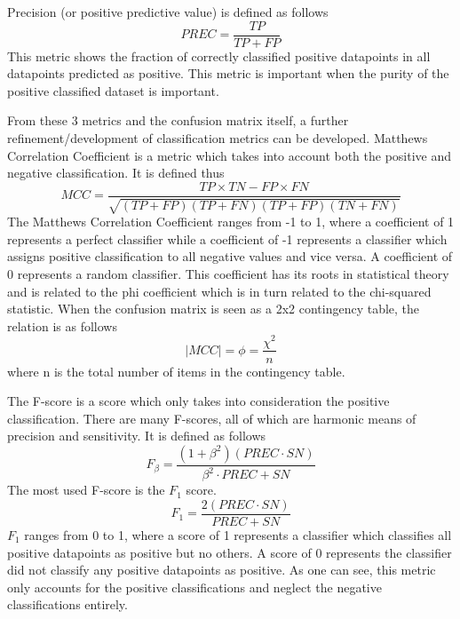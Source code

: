 \documentclass[a4paper,fleqn,usenatbib]{mnras}
\begin{document}
  Precision (or positive predictive value) is defined as follows
  \begin{equation}
  PREC=\frac{TP}{TP+FP}	
  \end{equation}
This metric shows the fraction of correctly classified positive datapoints in all datapoints predicted as positive. This metric is important when the purity of the positive classified dataset is important.

From these 3 metrics and the confusion matrix itself, a further refinement/development of classification metrics can be developed. Matthews Correlation Coefficient is a metric which takes into account both the positive and negative classification. \cite{MCC} It is defined thus
\begin{equation}
MCC = \frac{TP\times TN - FP\times FN}{\sqrt{(TP+FP)(TP+FN)(TP+FP)(TN+FN)}}	
\end{equation}
The Matthews Correlation Coefficient ranges from -1 to 1, where a coefficient of 1 represents a perfect classifier while a coefficient of -1 represents a classifier which assigns positive classification to all negative values and vice versa. A coefficient of 0 represents a random classifier. This coefficient has its roots in statistical theory and is related to the phi coefficient which is in turn related to the chi-squared statistic. When the confusion matrix is seen as a 2x2 contingency table, the relation is as follows
\begin{equation}
|MCC| = \phi = \frac{\chi^2}{n}
\end{equation}
where n is the total number of items in the contingency table. 

The F-score is a score which only takes into consideration the positive classification. There are many F-scores, all of which are harmonic means of precision and sensitivity. \citep{F1} It is defined as follows
\begin{equation}
F_\beta = \frac{(1+\beta^2)(PREC\cdot SN)}{\beta^2 \cdot PREC + SN}
\end{equation}
The most used F-score is the $F_1$ score. 
\begin{equation}
F_1 = \frac{2(PREC\cdot SN)}{PREC + SN}
\end{equation}
$F_1$ ranges from 0 to 1, where a score of 1 represents a classifier which classifies all positive datapoints as positive but no others. A score of 0 represents the classifier did not classify any positive datapoints as positive. As one can see, this metric only accounts for the positive classifications and neglect the negative classifications entirely. 
\end{document}
